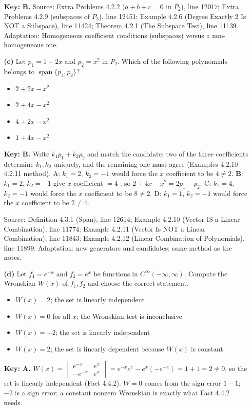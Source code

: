 \documentclass[11pt,a4paper]{article}
\newcommand{\Src}[1]{{\footnotesize\color{black!65}Source: #1}}
\begin{document}
\textbf{Key: B.} \Src{Extra Problems 4.2.2 ($a+b+c=0$ in $P_2$), line 12017; Extra Problems 4.2.9 (subspaces of $P_3$), line 12451; Example 4.2.6 (Degree Exactly 2 Is NOT a Subspace), line 11424; Theorem 4.2.1 (The Subspace Test), line 11139. Adaptation: Homogeneous coefficient conditions (subspaces) versus a non-homogeneous one.}\par
\textbf{(c)} Let $p_1=1+2x$ and $p_2=x^{2}$ in $P_2$. Which of the following polynomials belongs to $\operatorname{span}\{p_1,p_2\}$?\par
\begin{itemize}[leftmargin=8mm,itemsep=0pt]\item[A] $2+2x-x^{2}$\item[B$^{\ast}$] $2+4x-x^{2}$\item[C] $4+2x-x^{2}$\item[D] $1+4x-x^{2}$\end{itemize}
\textbf{Key: B.} Write $k_1p_1+k_2p_2$ and match the candidate: two of the three coefficients determine $k_1,k_2$ uniquely, and the remaining one must agree (Examples 4.2.10--4.2.11 method). A: $k_1=2$, $k_2=-1$ would force the $x$ coefficient to be $4\neq2$. \textbf{B}: $k_1=2$, $k_2=-1$ give $x$ coefficient $=4$ \checkmark, so $2+4x-x^{2}=2p_1-p_2$. C: $k_1=4$, $k_2=-1$ would force the $x$ coefficient to be $8\neq2$. D: $k_1=1$, $k_2=-1$ would force the $x$ coefficient to be $2\neq4$.\par
\Src{Definition 4.3.1 (Span), line 12614; Example 4.2.10 (Vector IS a Linear Combination), line 11774; Example 4.2.11 (Vector Is NOT a Linear Combination), line 11843; Example 4.2.12 (Linear Combination of Polynomials), line 11899. Adaptation: new generators and candidates; same method as the notes.}\par
\textbf{(d)} Let $f_1=e^{-x}$ and $f_2=e^{x}$ be functions in $C^{\infty}(-\infty,\infty)$. Compute the Wronskian $W(x)$ of $f_1,f_2$ and choose the correct statement.\par
\begin{itemize}[leftmargin=8mm,itemsep=0pt]\item[A$^{\ast}$] $W(x)=2$; the set is linearly independent\item[B] $W(x)=0$ for all $x$; the Wronskian test is inconclusive\item[C] $W(x)=-2$; the set is linearly independent\item[D] $W(x)=2$; the set is linearly dependent because $W(x)$ is constant\end{itemize}
\textbf{Key: A.} $W(x)=\begin{vmatrix}e^{-x}&e^{x}\\-e^{-x}&e^{x}\end{vmatrix}=e^{-x}e^{x}-e^{x}(-e^{-x})=1+1=2\neq0$, so the set is linearly independent (Fact 4.4.2). $W=0$ comes from the sign error $1-1$; $-2$ is a sign error; a constant nonzero Wronskian is exactly what Fact 4.4.2 needs.\par
\end{document}
